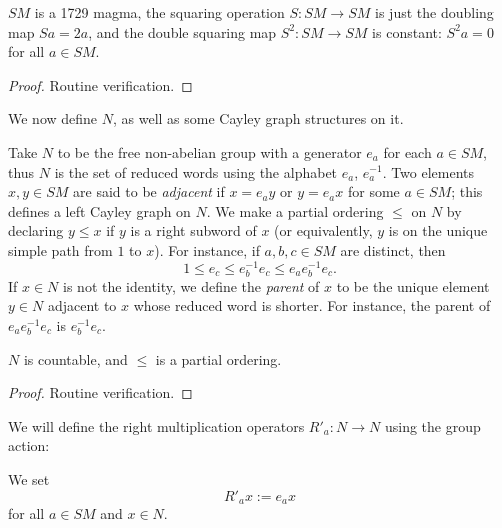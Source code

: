 \begin{lemma}\label{sm-1729}\leanok $SM$ is a 1729 magma, the squaring operation $S: SM \to SM$ is just the doubling map $Sa = 2a$, and the double squaring map $S^2: SM \to SM$ is constant: $S^2 a = 0$ for all $a \in SM$.
\end{lemma}

\begin{proof}\leanok Routine verification.
\end{proof}

We now define $N$, as well as some Cayley graph structures on it.

\begin{definition}[Definition of $N$]\label{n-def}\leanok Take $N$ to be the free non-abelian group with a generator $e_a$ for each $a \in SM$, thus $N$ is the set of reduced words using the alphabet $e_a$, $e_a^{-1}$.  Two elements $x,y \in SM$ are said to be \emph{adjacent} if $x = e_a y$ or $y = e_a x$ for some $a \in SM$; this defines a left Cayley graph on $N$.  We make a partial ordering $\leq$ on $N$ by declaring $y \leq x$ if $y$ is a right subword of $x$ (or equivalently, $y$ is on the unique simple path from $1$ to $x$).  For instance, if $a,b,c \in SM$ are distinct, then
  $$ 1 \leq e_c \leq e_b^{-1} e_c \leq e_a e_b^{-1} e_c.$$
If $x \in N$ is not the identity, we define the \emph{parent} of $x$ to be the unique element $y \in N$ adjacent to $x$ whose reduced word is shorter.  For instance, the parent of $e_a e_b^{-1} e_c$ is $e_b^{-1} e_c$.
\end{definition}

\begin{lemma}\label{n-prop}\leanok  $N$ is countable, and $\leq$ is a partial ordering.
\end{lemma}

\begin{proof}\leanok Routine verification.
\end{proof}

We will define the right multiplication operators $R'_a: N \to N$ using the group action:

\begin{definition}[Definition of $R'_a$]\label{ra-defn}\leanok We set
  \begin{equation}\label{ra-def}
    R'_a x := e_a x
  \end{equation}
  for all $a \in SM$ and $x \in N$.
\end{definition}

